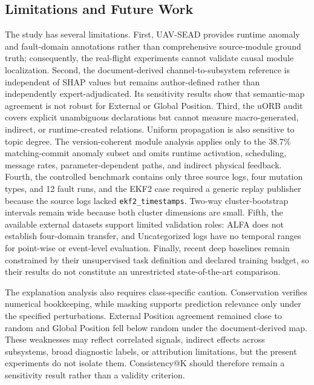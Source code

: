 \subsection{Limitations and Future Work}

The study has several limitations. First, UAV-SEAD provides runtime anomaly and fault-domain annotations rather than comprehensive source-module ground truth; consequently, the real-flight experiments cannot validate causal module localization. Second, the document-derived channel-to-subsystem reference is independent of SHAP values but remains author-defined rather than independently expert-adjudicated. Its sensitivity results show that semantic-map agreement is not robust for External or Global Position. Third, the uORB audit covers explicit unambiguous declarations but cannot measure macro-generated, indirect, or runtime-created relations. Uniform propagation is also sensitive to topic degree. The version-coherent module analysis applies only to the 38.7\% matching-commit anomaly subset and omits runtime activation, scheduling, message rates, parameter-dependent paths, and indirect physical feedback. Fourth, the controlled benchmark contains only three source logs, four mutation types, and 12 fault runs, and the EKF2 case required a generic replay publisher because the source logs lacked \texttt{ekf2\_timestamps}. Two-way cluster-bootstrap intervals remain wide because both cluster dimensions are small. Fifth, the available external datasets support limited validation roles: ALFA does not establish four-domain transfer, and Uncategorized logs have no temporal ranges for point-wise or event-level evaluation. Finally, recent deep baselines remain constrained by their unsupervised task definition and declared training budget, so their results do not constitute an unrestricted state-of-the-art comparison.

The explanation analysis also requires class-specific caution. Conservation verifies numerical bookkeeping, while masking supports prediction relevance only under the specified perturbations. External Position agreement remained close to random and Global Position fell below random under the document-derived map. These weaknesses may reflect correlated signals, indirect effects across subsystems, broad diagnostic labels, or attribution limitations, but the present experiments do not isolate them. Consistency@K should therefore remain a sensitivity result rather than a validity criterion.

